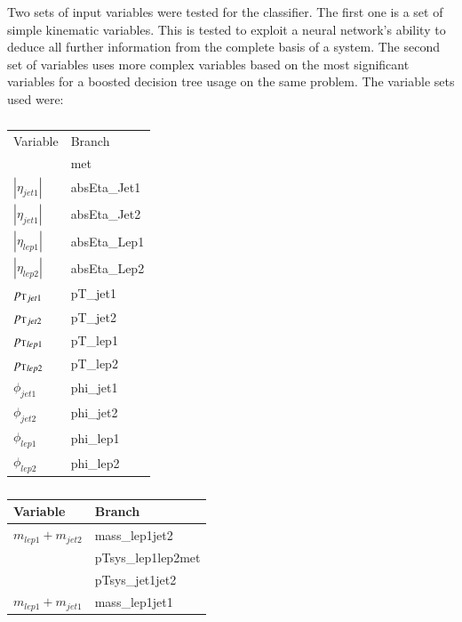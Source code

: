 Two sets of input variables were tested for the classifier.
The first one is a set of simple kinematic variables. This is tested to exploit a neural network's ability to deduce all further information from the complete basis of a system.
The second set of variables uses more complex variables based on the most significant variables for a boosted decision tree usage on the same problem.
The variable sets used were:
%
%
%
\begin{table}[h]
    \begin{minipage}{.5\linewidth}
      \caption{}
      \centering
		\begin{tabular}{l|l}
		Variable                              & Branch                            \\
		\pTmiss                & met                               \\ \hline
		$|\eta_{jet1}|$ & absEta\_Jet1 \\ \hline
		$|\eta_{jet1}|$ & absEta\_Jet2 \\ \hline
		$|\eta_{lep1}|$ & absEta\_Lep1 \\ \hline
		$|\eta_{lep2}|$ & absEta\_Lep2 \\ \hline
		${p_{\text{T}}}_{jet1}$  & pT\_jet1    \\ \hline
		${p_{\text{T}}}_{jet2}$    & pT\_jet2     \\ \hline
		${p_{\text{T}}}_{lep1}$    & pT\_lep1     \\ \hline
		${p_{\text{T}}}_{lep2}$    & pT\_lep2     \\ \hline
		$\phi_{jet1}$   & phi\_jet1    \\ \hline
		$\phi_{jet2}$   & phi\_jet2    \\ \hline
		$\phi_{lep1}$   & phi\_lep1    \\ \hline
		$\phi_{lep2}$   & phi\_lep2    \\ \hline
		\end{tabular}
    \end{minipage}%
    \begin{minipage}{.5\linewidth}
      \centering
        \caption{}
		\begin{tabular}{l|l}
		\hline
		Variable & Branch                        \\ \hline
		$m_{lep1} + m_{jet2}$									& mass\_lep1jet2                \\ \hline
		         & pTsys\_lep1lep2met            \\ \hline
		         & pTsys\_jet1jet2               \\ \hline
		$m_{lep1} + m_{jet1}$									& mass\_lep1jet1                \\ \hline

\end{tabular}
\end{minipage}
\end{table}

